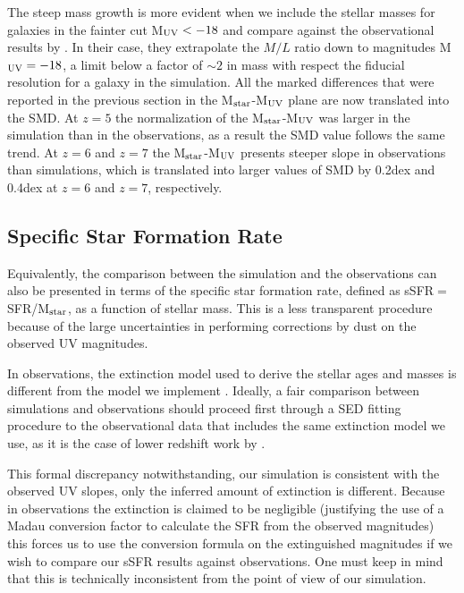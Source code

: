 \documentclass{emulateapj}
\begin{document}
The steep mass growth is more evident when we include the stellar masses for
galaxies in the fainter cut M$_{\rm UV}<-18$ and compare against the observational
results by \citep{2011ApJ...735L..34G}. In their case, they extrapolate the $M/L$
ratio down to magnitudes M$_{\rm UV}=-18$, a limit below a factor
of $\sim 2$ in mass with respect the fiducial resolution for a galaxy
in the simulation. All the marked differences that were reported in
the previous section in the M$_{\rm   star}$-M$_{\rm UV}$ plane are
now translated into the SMD. At $z=5$ the normalization of the M$_{\rm
  star}$-M$_{\rm UV}$ was larger in the simulation than in the
observations, as a result the SMD value follows the same trend. At
$z=6$ and $z=7$ the M$_{\rm star}$-M$_{\rm UV}$  presents
steeper slope in observations than simulations, which is translated
into larger values of SMD by 0.2dex and 0.4dex at $z=6$ and $z=7$, 
respectively.  


\subsection{Specific Star Formation Rate}


Equivalently, the comparison between the simulation and the
observations can also be presented in terms of the specific star formation
rate, defined as sSFR$=$SFR/M$_{\rm star}$, as a function of stellar
mass. This is a less transparent procedure because of the large uncertainties in performing corrections by dust on the observed UV magnitudes.

In observations, the extinction model used to derive the stellar ages and masses is different from the model we implement \citep{2009ApJ...697.1493S,2011ApJ...735L..34G}. Ideally, a fair comparison between simulations and observations should proceed first through a SED fitting procedure to the observational data that includes the same extinction model we use, as it is the case of lower redshift work by \cite{2008MNRAS.388.1595D}.

This formal discrepancy notwithstanding, our simulation is consistent with the observed UV slopes, only the inferred amount of extinction is different. Because in observations the extinction is claimed to be negligible (justifying the use of a Madau conversion factor to calculate the SFR from the observed magnitudes) this forces us to use the \citet{1998ApJ...498..106M}  conversion formula on the extinguished magnitudes if we wish to compare our sSFR results against observations. One must keep in mind that this is technically inconsistent from the point of view of our simulation.
\end{document}

